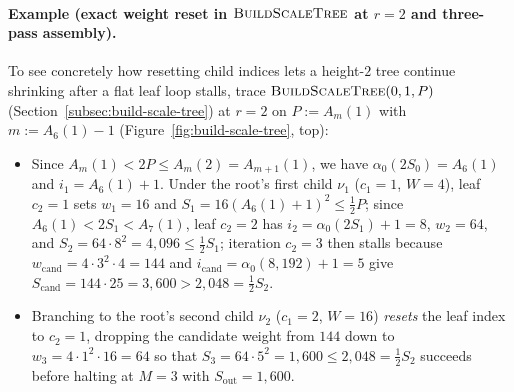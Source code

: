 \documentclass[11pt]{article}
\theoremstyle{definition}
\theoremstyle{remark}
\newcommand{\BuildScaleTree}{\textnormal{\scshape BuildScaleTree}}
\begin{document}
\paragraph{Example (exact weight reset in $\BuildScaleTree$ at $r = 2$ and three-pass assembly).}
To see concretely how resetting child indices lets a height-$2$ tree continue shrinking after a flat leaf loop stalls, trace $\BuildScaleTree(0, 1, P)$ (Section~\ref{subsec:build-scale-tree}) at $r = 2$ on $P := A_m(1)$ with $m := A_6(1) - 1$ (Figure~\ref{fig:build-scale-tree}, top):
\begin{itemize}[leftmargin=2em, itemsep=1pt]
  \item Since $A_m(1) < 2 P \le A_m(2) = A_{m+1}(1)$, we have $\alpha_0(2 S_0) = A_6(1)$ and $i_1 = A_6(1) + 1$. Under the root's first child $\nu_1$ ($c_1 = 1$, $W = 4$), leaf $c_2 = 1$ sets $w_1 = 16$ and $S_1 = 16(A_6(1) + 1)^2 \le \frac{1}{2} P$; since $A_6(1) < 2 S_1 < A_7(1)$, leaf $c_2 = 2$ has $i_2 = \alpha_0(2 S_1) + 1 = 8$, $w_2 = 64$, and $S_2 = 64 \cdot 8^2 = 4{,}096 \le \frac{1}{2} S_1$; iteration $c_2 = 3$ then stalls because $w_{\mathrm{cand}} = 4 \cdot 3^2 \cdot 4 = 144$ and $i_{\mathrm{cand}} = \alpha_0(8{,}192) + 1 = 5$ give $S_{\mathrm{cand}} = 144 \cdot 25 = 3{,}600 > 2{,}048 = \frac{1}{2} S_2$.
  \item Branching to the root's second child $\nu_2$ ($c_1 = 2$, $W = 16$) \emph{resets} the leaf index to $c_2 = 1$, dropping the candidate weight from $144$ down to $w_3 = 4 \cdot 1^2 \cdot 16 = 64$ so that $S_3 = 64 \cdot 5^2 = 1{,}600 \le 2{,}048 = \frac{1}{2} S_2$ succeeds before halting at $M = 3$ with $S_{\mathrm{out}} = 1{,}600$.
\end{itemize}
\end{document}
